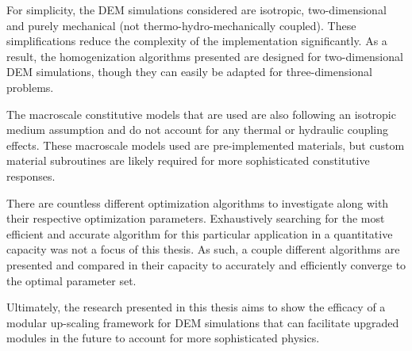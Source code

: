 For simplicity, the DEM simulations considered are isotropic, two-dimensional and purely mechanical (not thermo-hydro-mechanically coupled). These simplifications reduce the complexity of the implementation significantly. As a result, the homogenization algorithms presented are designed for two-dimensional DEM simulations, though they can easily be adapted for three-dimensional problems.

The macroscale constitutive models that are used are also following an isotropic medium assumption and do not account for any thermal or hydraulic coupling effects. These macroscale models used are pre-implemented materials, but custom material subroutines are likely required for more sophisticated constitutive responses. 

There are countless different optimization algorithms to investigate along with their respective optimization parameters. Exhaustively searching for the most efficient and accurate algorithm for this particular application in a quantitative capacity was not a focus of this thesis. As such, a couple different algorithms are presented and compared in their capacity to accurately and efficiently converge to the optimal parameter set.

Ultimately, the research presented in this thesis aims to show the efficacy of a modular up-scaling framework for DEM simulations that can facilitate upgraded modules in the future to account for more sophisticated physics.
